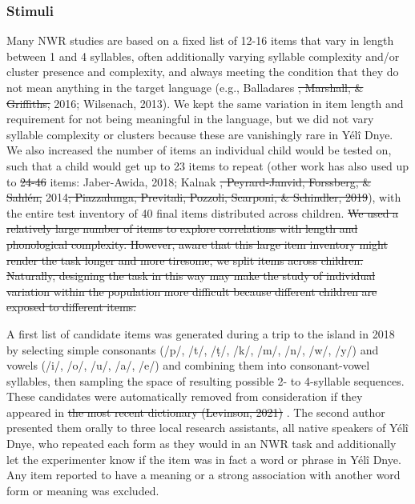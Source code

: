 \documentclass[english,,man,floatsintext]{apa6} %
\providecommand{\DIFaddtex}[1]{{\protect\color{blue}\uwave{#1}}} %
\providecommand{\DIFdeltex}[1]{{\protect\color{red}\sout{#1}}}                      %
\providecommand{\DIFaddbegin}{} %
\providecommand{\DIFaddend}{} %
\providecommand{\DIFdelbegin}{} %
\providecommand{\DIFdelend}{} %
\providecommand{\DIFadd}[1]{\texorpdfstring{\DIFaddtex{#1}}{#1}} %
\providecommand{\DIFdel}[1]{\texorpdfstring{\DIFdeltex{#1}}{}} %
\newcommand{\DIFscaledelfig}{0.5}
\newlength{\DIFdelgraphicswidth} %
\newlength{\DIFdelgraphicsheight} %
\newcommand{\DIFaddincludegraphics}[2][]{{\color{blue}\fbox{\DIFOincludegraphics[#1]{#2}}}} %
\newcommand{\DIFdelincludegraphics}[2][]{%
	\sbox{\DIFdelgraphicsbox}{\DIFOincludegraphics[#1]{#2}}%
	\settoboxwidth{\DIFdelgraphicswidth}{\DIFdelgraphicsbox} %
	\settoboxtotalheight{\DIFdelgraphicsheight}{\DIFdelgraphicsbox} %
	\scalebox{\DIFscaledelfig}{%
		\parbox[b]{\DIFdelgraphicswidth}{\usebox{\DIFdelgraphicsbox}\\[-\baselineskip] \rule{\DIFdelgraphicswidth}{0em}}\llap{\resizebox{\DIFdelgraphicswidth}{\DIFdelgraphicsheight}{%
				\setlength{\unitlength}{\DIFdelgraphicswidth}%
				\begin{picture}(1,1)%
				\thicklines\linethickness{2pt} %
				{\color[rgb]{1,0,0}\put(0,0){\framebox(1,1){}}}%
				{\color[rgb]{1,0,0}\put(0,0){\line( 1,1){1}}}%
				{\color[rgb]{1,0,0}\put(0,1){\line(1,-1){1}}}%
				\end{picture}%
			}\hspace*{3pt}}} %
} %
\DeclareRobustCommand{\DIFaddbegin}{\DIFOaddbegin \let\includegraphics\DIFaddincludegraphics} %
\DeclareRobustCommand{\DIFaddend}{\DIFOaddend \let\includegraphics\DIFOincludegraphics} %
\DeclareRobustCommand{\DIFdelbegin}{\DIFOdelbegin \let\includegraphics\DIFdelincludegraphics} %
\DeclareRobustCommand{\DIFdelend}{\DIFOaddend \let\includegraphics\DIFOincludegraphics} %
\begin{document}
\DIFdelend \hypertarget{stimuli}{%
	\subsubsection{Stimuli}\label{stimuli}}

Many NWR studies are based on a fixed list of 12-16 items that vary in length between 1 and 4 syllables, often additionally varying syllable complexity and/or cluster presence and complexity, and always meeting the condition that they do not mean anything in the target language (e.g., Balladares \DIFdelbegin \DIFdel{, Marshall, \& Griffiths, }\DIFdelend \DIFaddbegin \DIFadd{et al., }\DIFaddend 2016; Wilsenach, 2013). We kept the same variation in item length and requirement for not being meaningful in the language, but we did not vary syllable complexity or clusters because these are vanishingly rare in Yélî Dnye. We also increased the number of items an individual child would be tested on, such that a child would get up to 23 items to repeat (other work has also used up to \DIFdelbegin \DIFdel{24-46 }\DIFdelend \DIFaddbegin \DIFadd{24-30 }\DIFaddend items: Jaber-Awida, 2018; Kalnak \DIFdelbegin \DIFdel{, Peyrard-Janvid, Forssberg, \& Sahlén, }\DIFdelend \DIFaddbegin \DIFadd{et al., }\DIFaddend 2014\DIFdelbegin \DIFdel{; Piazzalunga, Previtali, Pozzoli, Scarponi, \& Schindler, 2019}\DIFdelend ), with the entire test inventory of 40 final items distributed across children.
\DIFdelbegin \DIFdel{We used a relatively large number of items to explore correlations with length and phonological complexity. However, aware that this large item inventory might render the task longer and more tiresome, we split items across children. Naturally, designing the task in this way may make the study of individual variation within the population more difficult because different children are exposed to different items.
}\DIFdelend 

A first list of candidate items was generated during a trip to the island in 2018 by selecting simple consonants (/p/, /t/, /ṭ/, /k/, /m/, /n/, /w/, /y/) and vowels (/i/, /o/, /u/, /a/, /e/) and combining them into consonant-vowel syllables, then sampling the space of resulting possible 2- to 4-syllable sequences. These candidates were automatically removed from consideration if they appeared in \DIFdelbegin \DIFdel{the most recent dictionary (Levinson, 2021) }\DIFdelend \DIFaddbegin \DIFadd{Levinson's (2015) dictionary}\DIFaddend . The second author presented them orally to three local research assistants, all native speakers of Yélî Dnye, who repeated each form as they would in an NWR task and additionally let the experimenter know if the item was in fact a word or phrase in Yélî Dnye. Any item reported to have a meaning or a strong association with another word form or meaning was excluded.
\end{document}
